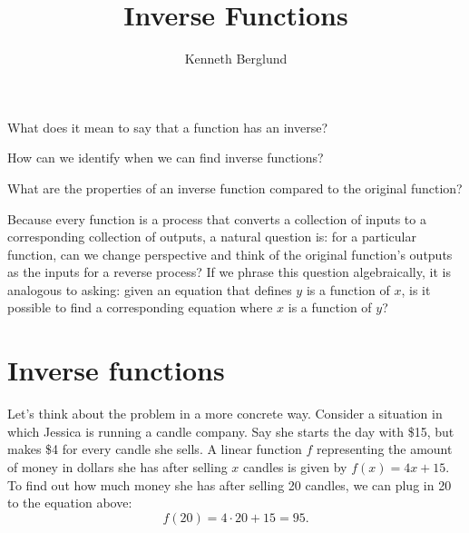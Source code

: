 \documentclass[nooutcomes]{ximera}
\author{Kenneth Berglund}
\title{Inverse Functions}
\begin{document}
\begin{abstract}
  
\end{abstract}
\maketitle



\begin{motivatingQuestions}
\item What does it mean to say that a function has an inverse? 
\item How can we identify when we can find inverse functions?
\item What are the properties of an inverse function compared to the original function?
\end{motivatingQuestions}



Because every function is a process that converts a collection of inputs to a corresponding collection of outputs, a natural question is: for a particular function, can we change perspective and think of the original function's outputs as the inputs for a reverse process? If we phrase this question algebraically, it is analogous to asking: given an equation that defines $y$ is a function of $x$, is it possible to find a corresponding equation where $x$ is a function of $y$?



\section{Inverse functions}
Let's think about the problem in a more concrete way. Consider a situation in which Jessica is running a candle company. Say she starts the day with \$15, but makes \$4 for every candle she sells. A linear function $f$ representing the amount of money in dollars she has after selling $x$ candles is given by $f(x) = 4x + 15$. To find out how much money she has after selling 20 candles, we can plug in 20 to the equation above:
$$
f(20) = 4\cdot 20 + 15 = 95.
$$
\end{document}
